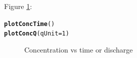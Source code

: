 \documentclass[a4paper,11pt]{article}\usepackage[]{graphicx}\usepackage[]{color}
\makeatletter
\newcommand{\hlnum}[1]{\textcolor[rgb]{0.686,0.059,0.569}{#1}}%
\newcommand{\hlstd}[1]{\textcolor[rgb]{0.345,0.345,0.345}{#1}}%
\newcommand{\hlkwc}[1]{\textcolor[rgb]{0.333,0.667,0.333}{#1}}%
\newcommand{\hlkwd}[1]{\textcolor[rgb]{0.737,0.353,0.396}{\textbf{#1}}}%
\newenvironment{kframe}{%
 \def\at@end@of@kframe{}%
 \ifinner\ifhmode%
  \def\at@end@of@kframe{\end{minipage}}%
  \begin{minipage}{\columnwidth}%
 \fi\fi%
 \def\FrameCommand##1{\hskip\@totalleftmargin \hskip-\fboxsep
 \colorbox{shadecolor}{##1}\hskip-\fboxsep
     \hskip-\linewidth \hskip-\@totalleftmargin \hskip\columnwidth}%
 \MakeFramed {\advance\hsize-\width
   \@totalleftmargin\z@ \linewidth\hsize
   \@setminipage}}%
 {\par\unskip\endMakeFramed%
 \at@end@of@kframe}
\newenvironment{knitrout}{}{} %
\makeatother
\begin{document}
Figure \ref{fig:plotConcTime}:
\begin{knitrout}
\color{fgcolor}\begin{kframe}
\begin{alltt}
\hlkwd{plotConcTime}\hlstd{()}
\hlkwd{plotConcQ}\hlstd{(}\hlkwc{qUnit}\hlstd{=}\hlnum{1}\hlstd{)}
\end{alltt}
\end{kframe}\begin{figure}[]
\caption[Concentration vs time or discharge]{Concentration vs time or discharge\label{fig:plotConcTime}}
\end{figure}


\end{knitrout}
\end{document}
